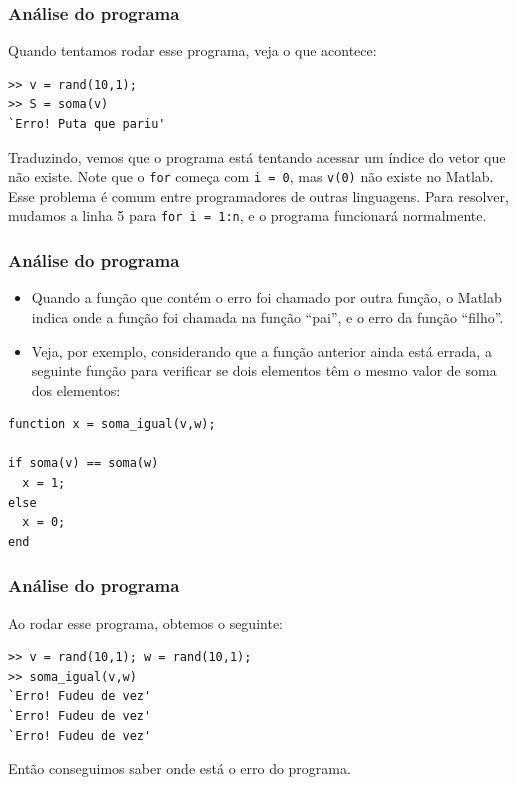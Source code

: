\documentclass{beamer}
\newcommand{\ssiz}{\scriptsize}
\begin{document}
\begin{frame}[fragile]
\frametitle{An\'alise do programa}

Quando tentamos rodar esse programa, veja o que acontece:
{\scriptsize
\begin{verbatim}
>> v = rand(10,1);
>> S = soma(v)
`Erro! Puta que pariu'
\end{verbatim}
}
\pause

Traduzindo, vemos que o programa est\'a tentando acessar um \'indice do vetor que n\~ao existe. Note que o {\tt for} come\c{c}a com {\tt i = 0}, mas {\tt v(0)} n\~ao existe no Matlab. Esse problema \'e comum entre programadores de outras linguagens. Para resolver, mudamos a linha 5 para \verb+for i = 1:n+, e o programa funcionar\'a normalmente.
\end{frame}

\begin{frame}[fragile]
 \frametitle{An\'alise do programa}

\begin{itemize} 
 \item<1-> Quando a fun\c{c}\~ao que cont\'em o erro foi chamado por outra fun\c{c}\~ao, o Matlab indica onde a fun\c{c}\~ao foi chamada na fun\c{c}\~ao ``pai'', e o erro da fun\c{c}\~ao ``filho''.
 \item<2-> Veja, por exemplo, considerando que a fun\c{c}\~ao anterior ainda est\'a errada, a seguinte fun\c{c}\~ao para verificar se dois elementos t\^em o mesmo valor de soma dos elementos:
\end{itemize}
\pause \pause
{\ssiz
\begin{verbatim}
function x = soma_igual(v,w);

if soma(v) == soma(w)
  x = 1;
else
  x = 0;
end
\end{verbatim}
}

\end{frame}

\begin{frame}[fragile]
\frametitle{An\'alise do programa}

Ao rodar esse programa, obtemos o seguinte:
\pause
{\ssiz
\begin{verbatim}
>> v = rand(10,1); w = rand(10,1);
>> soma_igual(v,w)
`Erro! Fudeu de vez'
`Erro! Fudeu de vez'
`Erro! Fudeu de vez'
\end{verbatim}	
}
\pause

Ent\~ao conseguimos saber onde est\'a o erro do programa.

\end{frame}
\end{document}
